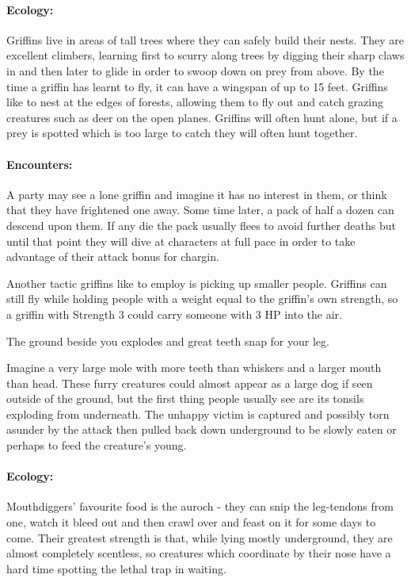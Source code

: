 \paragraph{Ecology:} Griffins live in areas of tall trees where they can safely build their nests.  They are excellent climbers, learning first to scurry along trees by digging their sharp claws in and then later to glide in order to swoop down on prey from above.  By the time a griffin has learnt to fly, it can have a wingspan of up to 15 feet.  Griffins like to nest at the edges of forests, allowing them to fly out and catch grazing creatures such as deer on the open planes.  Griffins will often hunt alone, but if a prey is spotted which is too large to catch  they will often hunt together.

\paragraph{Encounters:} A party may see a lone griffin and imagine it has no interest in them, or think that they have frightened one away.  Some time later, a pack of half a dozen can descend upon them.  If any die the pack usually flees to avoid further deaths but until that point they will dive at characters at full pace in order to take advantage of their attack bonus for chargin.

Another tactic griffins like to employ is picking up smaller people.  Griffins can still fly while holding people with a weight equal to the griffin's own strength, so a griffin with Strength 3 could carry someone with 3 HP into the air.

\label{mouthdigger}
\mouthdigger


\begin{boxtext}

	The ground beside you explodes and great teeth snap for your leg.

\end{boxtext}

Imagine a very large mole with more teeth than whiskers and a larger mouth than head.  These furry creatures could almost appear as a large dog if seen outside of the ground, but the first thing people usually see are its tonsils exploding from underneath.  The unhappy victim is captured and possibly torn asunder by the attack then pulled back down underground to be slowly eaten or perhaps to feed the creature's young.

\paragraph{Ecology:} Mouthdiggers' favourite food is the auroch - they can snip the leg-tendons from one, watch it bleed out and then crawl over and feast on it for some days to come.  Their greatest strength is that, while lying mostly underground, they are almost completely scentless, so creatures which coordinate by their nose have a hard time spotting the lethal trap in waiting.

